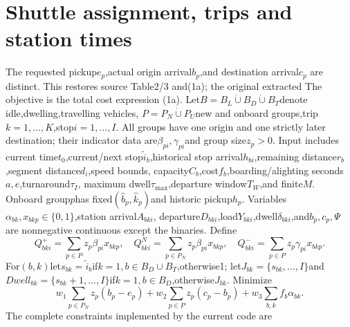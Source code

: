 \documentclass{article}
\begin{document}
\section*{Shuttle assignment, trips and station times}
The requested pickup$e_p$,actual origin arrival$b_p$,and destination arrival$c_p$
are distinct. This restores source Table2/3 and(1a); the original extracted
The objective is the total cost expression (1a).
Let$B=B_L\dot\cup B_D\dot\cup B_T$denote idle,dwelling,travelling vehicles,
$P=P_N\dot\cup P_U$new and onboard groups,trip$k=1,\ldots,K$,stop$i=1,\ldots,I$.
All groups have one origin and one strictly later destination; their indicator
data are$\beta_{pi},\gamma_{pi}$and group size$z_p>0$.
Input includes current time$t_0$,current/next stop$\tilde i_b$,historical stop
arrival$h_{bi}$,remaining distance$r_b$,segment distance$d_i$,speed bounds,
capacity$C_b$,cost$f_b$,boarding/alighting seconds$a,e$,turnaround$\tau_I$,
maximum dwell$\tau_{\max}$,departure window$T_W$,and finite$M$.
Onboard group$p$has fixed$(\hat b_p,\hat k_p)$and historic pickup$h_p$.
Variables$\alpha_{bk},x_{bkp}\in\{0,1\}$,station arrival$A_{bki}$,
departure$D_{bki}$,load$Y_{bki}$,dwell$\delta_{bki}$,and$b_p,c_p,\Psi$
are nonnegative continuous except the binaries.
Define
\[
Q^+_{bki}=\sum_{p\in P}z_p\beta_{pi}x_{bkp},\quad
Q^N_{bki}=\sum_{p\in P_N}z_p\beta_{pi}x_{bkp},\quad
Q^-_{bki}=\sum_{p\in P}z_p\gamma_{pi}x_{bkp}.
\]
For$(b,k)$let$s_{bk}=\tilde i_b$if$k=1,b\in B_D\cup B_T$,otherwise1;
let$J_{bk}=\{s_{bk},\ldots,I\}$and
$Dwell_{bk}=\{s_{bk}+1,\ldots,I\}$if$k=1,b\in B_D$,otherwise$J_{bk}$.
Minimize
\[
w_1\sum_{p\in P_N}z_p(b_p-e_p)+w_2\sum_{p\in P}z_p(c_p-b_p)
+w_3\sum_{b,k}f_b\alpha_{bk}.
\]
The complete constraints implemented by the current code are
\end{document}
